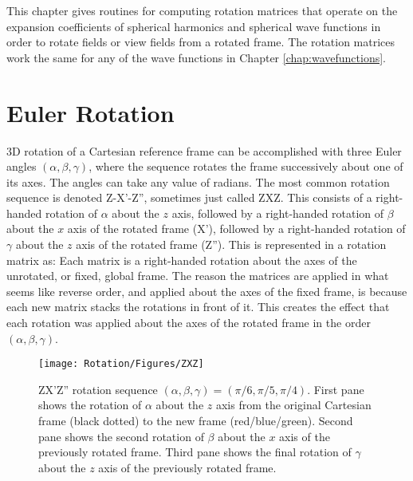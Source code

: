 

\vspace{-7mm}
This chapter gives routines for computing rotation matrices that operate on the expansion coefficients of spherical harmonics and spherical wave functions in order to rotate fields or view fields from a rotated frame.  The rotation matrices work the same for any of the wave functions in Chapter \ref{chap:wavefunctions}.

\section{Euler Rotation}
3D rotation of a Cartesian reference frame can be accomplished with three Euler angles $(\alpha,\beta,\gamma)$, where the sequence rotates the frame successively about one of its axes. The angles can take any value of radians. The most common rotation sequence is denoted Z-X'-Z'', sometimes just called ZXZ. This consists of a right-handed rotation of $\alpha$ about the $z$ axis, followed by a right-handed rotation of $\beta$ about the $x$ axis of the rotated frame (X'), followed by a right-handed rotation of $\gamma$ about the $z$ axis of the rotated frame (Z''). This is represented in a rotation matrix as:
Each matrix is a right-handed rotation about the axes of the unrotated, or fixed, global frame. The reason the matrices are applied in what seems like reverse order, and applied about the axes of the fixed frame, is because each new matrix stacks the rotations in front of it. This creates the effect that each rotation was applied about the axes of the rotated frame in the order $(\alpha,\beta,\gamma)$.

\begin{figure}[H] 
   \centering
   \texttt{[image: Rotation/Figures/ZXZ]} 
   \caption{ZX'Z'' rotation sequence $(\alpha,\beta,\gamma) = (\pi/6, \pi/5, \pi/4)$.  First pane shows the rotation of $\alpha$ about the $z$ axis from the original Cartesian frame (black dotted) to the new frame (red/blue/green). Second pane shows the second rotation of $\beta$ about the $x$ axis of the previously rotated frame. Third pane shows the final rotation of $\gamma$ about the $z$ axis of the previously rotated frame.}
   \label{fig1}
\end{figure}


